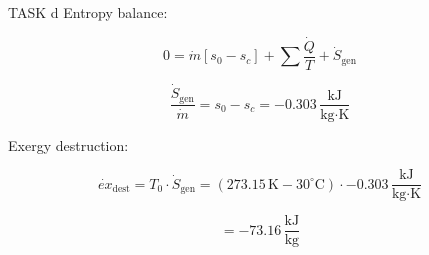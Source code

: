 TASK d  
Entropy balance:  

\[
0 = \dot{m} \left[ s_0 - s_c \right] + \sum \frac{\dot{Q}}{T} + \dot{S}_{\text{gen}}
\]

\[
\frac{\dot{S}_{\text{gen}}}{\dot{m}} = s_0 - s_c = -0.303 \, \frac{\text{kJ}}{\text{kg·K}}
\]

Exergy destruction:  

\[
\dot{ex}_{\text{dest}} = T_0 \cdot \dot{S}_{\text{gen}} = \left( 273.15 \, \text{K} - 30^\circ\text{C} \right) \cdot -0.303 \, \frac{\text{kJ}}{\text{kg·K}}
\]

\[
= -73.16 \, \frac{\text{kJ}}{\text{kg}}
\]